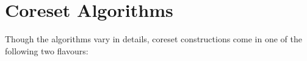 \section{Coreset Algorithms}

Though the algorithms vary in details, coreset constructions come in one of the following two flavours: